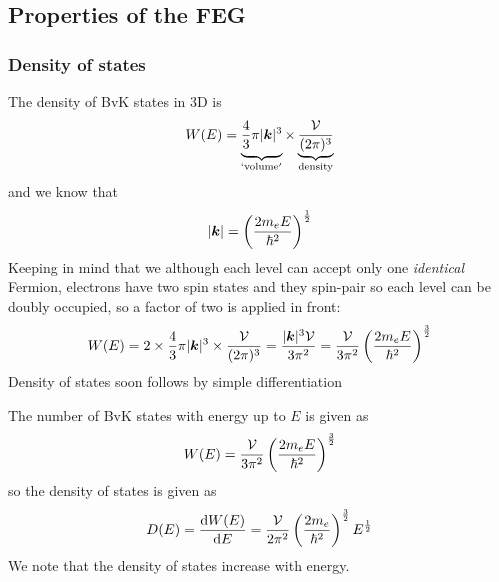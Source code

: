 \subsection{Properties of the FEG}
\subsubsection{Density of states}
The density of BvK states in 3D is 
\begin{equation}
	W(E)=\underbrace{\vphantom{\frac{\mathcal{V}}{(2\pi)^3}} \frac{4}{3}\pi|\bvec{k}|^3}_{\mathrm{`volume'}}\times\underbrace{\frac{\mathcal{V}}{(2\pi)^3}}_{\mathrm{density}}
\end{equation}
and we know that
\begin{equation}
	|\boldsymbol{k}|=\left(\frac{2m_eE}{\hbar^2} \right)^{\frac{1}{2} }
\end{equation}
Keeping in mind that we although each level can accept only one \emph{identical} Fermion, electrons have two spin states and they spin-pair so each level can be doubly occupied, so a factor of two is applied in front:
\begin{equation}
	W(E)=2\times\frac{4}{3}\pi|\boldsymbol{k}|^3\times\frac{\mathcal{V}}{(2\pi)^3}=\frac{|\boldsymbol{k}|^3\mathcal{V}}{3\pi^2}=\frac{\mathcal{V}}{3\pi^2}\left(\frac{2m_eE}{\hbar^2} \right)^{\frac{3}{2}}
\end{equation}
Density of states soon follows by simple differentiation
\begin{thrm}
The number of BvK states with energy up to $E$ is given as
\begin{equation}
	W(E)=\frac{\mathcal{V}}{3\pi^2}\left(\frac{2m_eE}{\hbar^2} \right)^{\frac{3}{2}}
\end{equation}
so the density of states is given as
\begin{equation}
	D(E)=\diff{W(E)}{E}=\frac{\mathcal{V}}{2\pi^2}\lf(\frac{2m_e}{\hbar^2} \rt)^{\frac{3}{2}}E^{\frac{1}{2}}
\end{equation}
We note that the density of states increase with energy.
\end{thrm}
